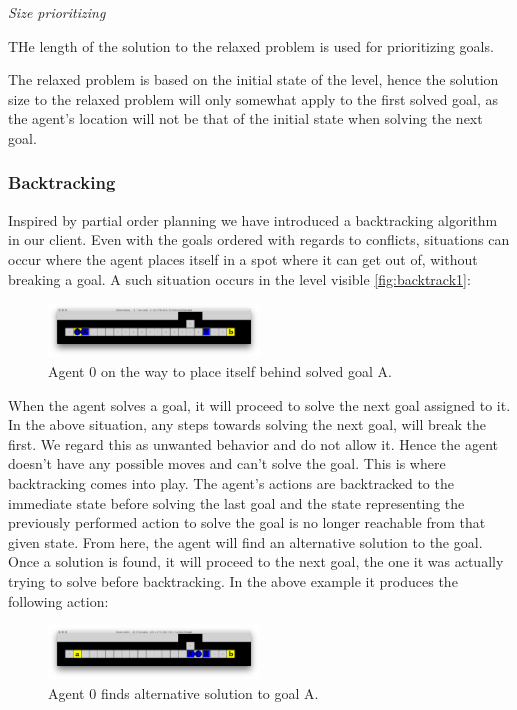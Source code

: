\documentclass[Main]{subfiles}
\begin{document}
\textit{Size prioritizing} 

THe length of the solution to the relaxed problem is used for prioritizing goals. 

The relaxed problem is based on the initial state of the level, hence the solution size to the relaxed problem will only somewhat apply to the first solved goal, as the agent's location will not be that of the initial state when solving the next goal. 



\subsubsection{Backtracking}

Inspired by partial order planning we have introduced a backtracking algorithm in our client. Even with the goals ordered with regards to conflicts, situations can occur where the agent places itself in a spot where it can get out of, without breaking a goal. A such situation occurs in the level visible \autoref{fig:backtrack1}:
\begin{figure}[h!]
    \centering
    \includegraphics[width=0.5\textwidth]{backtrack1.png}
    \caption{Agent 0 on the way to place itself behind solved goal A.}
    \label{fig:backtrack1}
\end{figure}

When the agent solves a goal, it will proceed to solve the next goal assigned to it. In the above situation, any steps towards solving the next goal, will break the first. We regard this as unwanted behavior and do not allow it. Hence the agent doesn't have any possible moves and can't solve the goal. This is where backtracking comes into play. The agent's actions are backtracked to the immediate state before solving the last goal and the state representing the previously performed action to solve the goal is no longer reachable from that given state. From here, the agent will find an alternative solution to the goal. Once a solution is found, it will proceed to the next goal, the one it was actually trying to solve before backtracking. In the above example it produces the following action:
\begin{figure}[h!]
    \centering
    \includegraphics[width=0.5\textwidth]{backtrack2.png}
    \caption{Agent 0 finds alternative solution to goal A.}
    \label{fig:backtrack2}
\end{figure}
\end{document}
